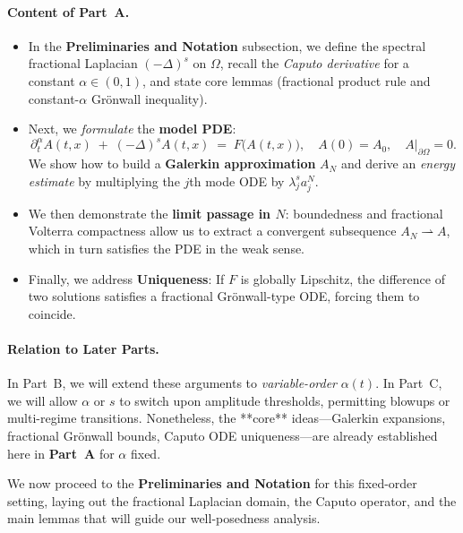 \documentclass[12pt]{article}
\begin{document}
\paragraph{Content of Part~A.}
\begin{itemize}
    \item In the \textbf{Preliminaries and Notation} subsection, we define the spectral fractional Laplacian \((-\Delta)^s\) on \(\Omega\), recall the \emph{Caputo derivative} for a constant \(\alpha\in(0,1)\), and state core lemmas (fractional product rule and constant-\(\alpha\) Gr\"onwall inequality).
    \item Next, we \emph{formulate} the \textbf{model PDE}:
      \[
      \partial_t^\alpha A(t,x)
      \;+\;
      (-\Delta)^s A(t,x)
      \;=\;
      F\bigl(A(t,x)\bigr),
      \quad
      A(0)=A_0,\quad
      A\big|_{\partial\Omega}=0.
      \]
      We show how to build a \textbf{Galerkin approximation} \(A_N\) and derive an \emph{energy estimate} by multiplying the $j$th mode ODE by \(\lambda_j^s a_j^N\).
    \item We then demonstrate the \textbf{limit passage in $N$}: boundedness and fractional Volterra compactness allow us to extract a convergent subsequence $A_N \rightharpoonup A$, which in turn satisfies the PDE in the weak sense.
    \item Finally, we address \textbf{Uniqueness}: If \(F\) is globally Lipschitz, the difference of two solutions satisfies a fractional Gr\"onwall-type ODE, forcing them to coincide. 
\end{itemize}

\paragraph{Relation to Later Parts.}
In Part~B, we will extend these arguments to \emph{variable-order} \(\alpha(t)\). In Part~C, we will allow \(\alpha\) or \(s\) to switch upon amplitude thresholds, permitting blowups or multi-regime transitions. Nonetheless, the **core** ideas—Galerkin expansions, fractional Gr\"onwall bounds, Caputo ODE uniqueness—are already established here in \textbf{Part~A} for \(\alpha\) fixed.

\vspace{2ex}
\noindent
We now proceed to the \textbf{Preliminaries and Notation} for this fixed-order setting, laying out the fractional Laplacian domain, the Caputo operator, and the main lemmas that will guide our well-posedness analysis.
\end{document}
